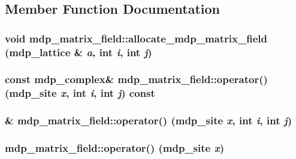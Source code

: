 \subsection{Member Function Documentation}
\hypertarget{classmdp__matrix__field_a468a38e8bc504fc7f21bdb333ca8630b}{
\subsubsection[{allocate\_\-mdp\_\-matrix\_\-field}]{\setlength{\rightskip}{0pt plus 5cm}void mdp\_\-matrix\_\-field::allocate\_\-mdp\_\-matrix\_\-field ({\bf mdp\_\-lattice} \& {\em a}, \/  int {\em i}, \/  int {\em j})}}
\label{classmdp__matrix__field_a468a38e8bc504fc7f21bdb333ca8630b}
\hypertarget{classmdp__matrix__field_a2a9dd3e66caef6fea9415aa8917e3ce9}{
\subsubsection[{operator()}]{\setlength{\rightskip}{0pt plus 5cm}const {\bf mdp\_\-complex}\& mdp\_\-matrix\_\-field::operator() ({\bf mdp\_\-site} {\em x}, \/  int {\em i}, \/  int {\em j}) const}}
\label{classmdp__matrix__field_a2a9dd3e66caef6fea9415aa8917e3ce9}
\hypertarget{classmdp__matrix__field_afdd2e11b6ab1b36f0bd6e354dbdefe42}{
\subsubsection[{operator()}]{\& mdp\_\-matrix\_\-field::operator() ({\bf mdp\_\-site} {\em x}, \/  int {\em i}, \/  int {\em j})}}
\label{classmdp__matrix__field_afdd2e11b6ab1b36f0bd6e354dbdefe42}
\hypertarget{classmdp__matrix__field_ade5f9563b36bcdd98e5341a4a29059fc}{
\subsubsection[{operator()}]{ mdp\_\-matrix\_\-field::operator() ({\bf mdp\_\-site} {\em x})}}
\label{classmdp__matrix__field_ade5f9563b36bcdd98e5341a4a29059fc}


